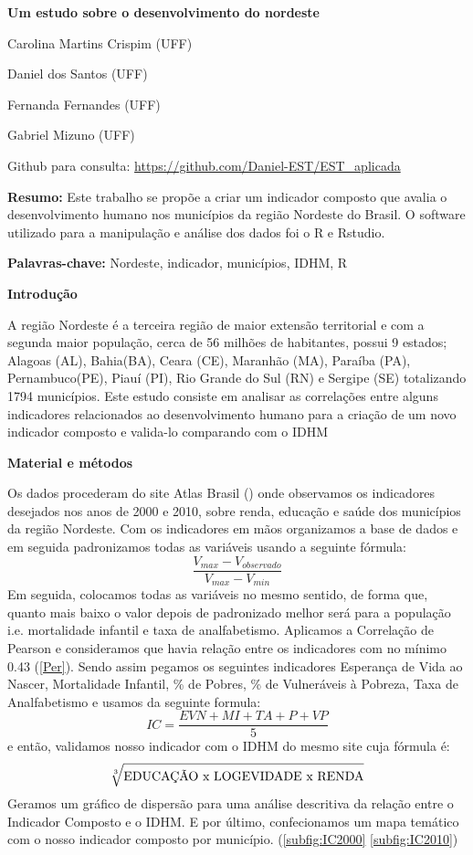 \documentclass[11pt,a4paper]{article}
\begin{document}
\begin{center}
\Large{\textbf{Um estudo sobre o desenvolvimento do nordeste}}

\bigskip

\begin{singlespace}
\large{Carolina Martins Crispim (UFF)

Daniel dos Santos (UFF)

Fernanda Fernandes (UFF)

Gabriel Mizuno (UFF)} 

\bigskip

\small{Github para consulta: \url{https://github.com/Daniel-EST/EST_aplicada}}
\end{singlespace}
\end{center}


\textbf{Resumo:} Este trabalho se propõe a criar um indicador composto que avalia o desenvolvimento humano nos municípios da região Nordeste do Brasil. O software utilizado para a manipulação e análise dos dados foi o R e Rstudio.

\textbf{Palavras-chave:} Nordeste, indicador, municípios, IDHM, R

\textbf{Introdução}

A região Nordeste é a terceira região de maior extensão territorial e com a segunda maior população, cerca de 56 milhões de habitantes, possui 9 estados; Alagoas (AL), Bahia(BA), Ceara (CE), Maranhão (MA), Paraíba (PA), Pernambuco(PE), Piauí (PI), Rio Grande do Sul (RN) e Sergipe (SE) totalizando 1794 municípios.
Este estudo consiste em analisar as correlações entre alguns indicadores relacionados ao desenvolvimento humano para a criação de um novo indicador composto e valida-lo comparando com o IDHM

\textbf{Material e métodos}

Os dados procederam do site Atlas Brasil (\cite{atlas}) onde observamos os indicadores desejados nos anos de 2000 e 2010, sobre renda, educação e saúde dos municípios da região Nordeste. Com os indicadores em mãos organizamos a base de dados e em seguida padronizamos todas as variáveis usando a seguinte fórmula: $$\frac{V_{max}-V_{observado}}{V_{max} - V_{min}} $$ Em seguida, colocamos todas as variáveis no mesmo sentido, de forma que, quanto mais baixo o valor depois de padronizado melhor será para a população i.e. mortalidade infantil e taxa de analfabetismo. Aplicamos a Correlação de Pearson e consideramos que havia relação entre os indicadores com no mínimo 0.43 (\ref{Per}). Sendo assim pegamos os seguintes indicadores Esperança de Vida ao Nascer, Mortalidade Infantil,  \% de Pobres, \% de Vulneráveis à Pobreza, Taxa de Analfabetismo e usamos da seguinte formula: $$ IC = \frac{EVN+MI+TA+P+VP}{5} $$ e então, validamos nosso indicador com o IDHM do mesmo site cuja fórmula é: $$ \sqrt[3]{\hbox{EDUCAÇÃO x LOGEVIDADE x RENDA}}$$ Geramos um gráfico de dispersão para uma análise descritiva da relação entre o Indicador Composto e o IDHM. E por último, confecionamos um mapa temático com o nosso indicador composto por município. (\ref{subfig:IC2000} \ref{subfig:IC2010})
\end{document}
